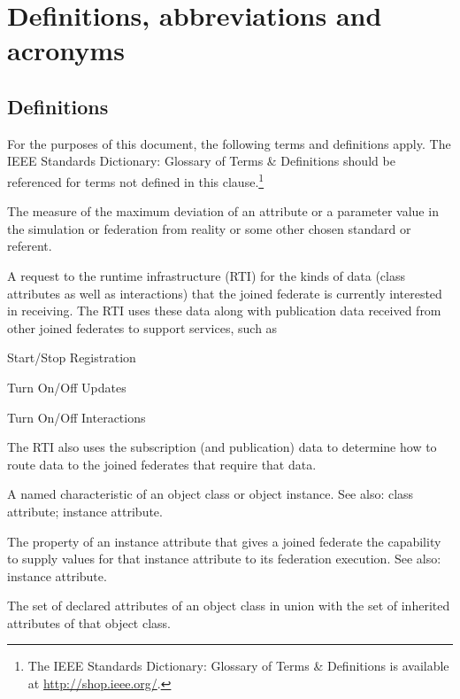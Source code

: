 \section{Definitions, abbreviations and acronyms}

\subsection{Definitions}

For the purposes of this document, the following terms and definitions apply. The IEEE Standards Dictionary: Glossary of Terms \& Definitions should be referenced for terms not defined in this clause.\footnote{The IEEE Standards Dictionary: Glossary of Terms \& Definitions is available at \url{http://shop.ieee.org/}.}

 The measure of the maximum deviation of an attribute or a parameter value in the simulation or federation from reality or some other chosen standard or referent.

 A request to the runtime infrastructure (RTI) for the kinds of data (class attributes as well as interactions) that the joined federate is currently interested in receiving. The RTI uses these data along with publication data received from other joined federates to support services, such as
\begin{stdalphalist}
    \item Start/Stop Registration
    \item Turn On/Off Updates
    \item Turn On/Off Interactions
\end{stdalphalist}
The RTI also uses the subscription (and publication) data to determine how to route data to the joined federates that require that data.

 A named characteristic of an object class or object instance. See also: class attribute; instance attribute.

 The property of an instance attribute that gives a joined federate the capability to supply values for that instance attribute to its federation execution. See also: instance attribute.

 The set of declared attributes of an object class in union with the set of inherited attributes of that object class.

